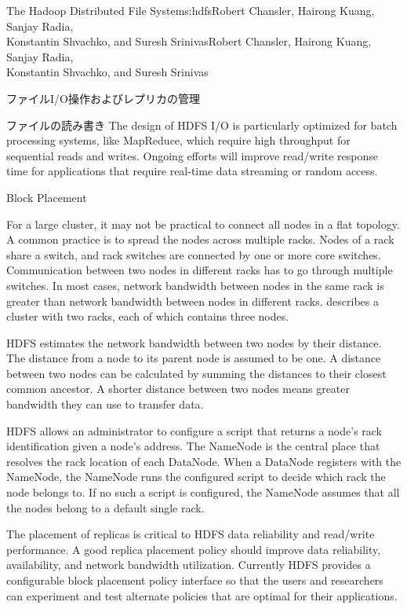 \begin{aosachaptertoc}{The Hadoop Distributed File System}{s:hdfs}{Robert Chansler, Hairong Kuang, Sanjay Radia, \\ Konstantin Shvachko, and Suresh Srinivas}{Robert Chansler, Hairong Kuang, Sanjay Radia, \\ \hspace*{0.9cm} Konstantin Shvachko, and Suresh Srinivas}
\begin{aosasect1}{ファイルI/O操作およびレプリカの管理}
\begin{aosasect2}{ファイルの読み書き}
The design of HDFS I/O is particularly optimized for batch processing
systems, like MapReduce, which require high throughput for sequential
reads and writes. Ongoing efforts will improve read/write response
time for applications that require real-time data streaming or random
access.

\end{aosasect2}

\begin{aosasect2}{Block Placement}

For a large cluster, it may not be practical to connect all nodes in a
flat topology. A common practice is to spread the nodes across
multiple racks. Nodes of a rack share a switch, and rack switches are
connected by one or more core switches. Communication between two
nodes in different racks has to go through multiple switches. In most
cases, network bandwidth between nodes in the same rack is greater
than network bandwidth between nodes in different racks.
 describes a cluster with two racks, each of
which contains three nodes.


HDFS estimates the network bandwidth between two nodes by their
distance. The distance from a node to its parent node is assumed to be
one. A distance between two nodes can be calculated by summing the
distances to their closest common ancestor.  A shorter distance
between two nodes means greater bandwidth they can use to transfer
data.

HDFS allows an administrator to configure a script that returns a
node's rack identification given a node's address. The NameNode is the
central place that resolves the rack location of each DataNode. When a
DataNode registers with the NameNode, the NameNode runs the configured
script to decide which rack the node belongs to. If no such a script
is configured, the NameNode assumes that all the nodes belong to a
default single rack.

The placement of replicas is critical to HDFS data reliability and
read/write performance. A good replica placement policy should improve
data reliability, availability, and network bandwidth
utilization. Currently HDFS provides a configurable block placement
policy interface so that the users and researchers can experiment and
test alternate policies that are optimal for their applications.


\end{aosasect2}
\end{aosasect1}
\end{aosachaptertoc}
